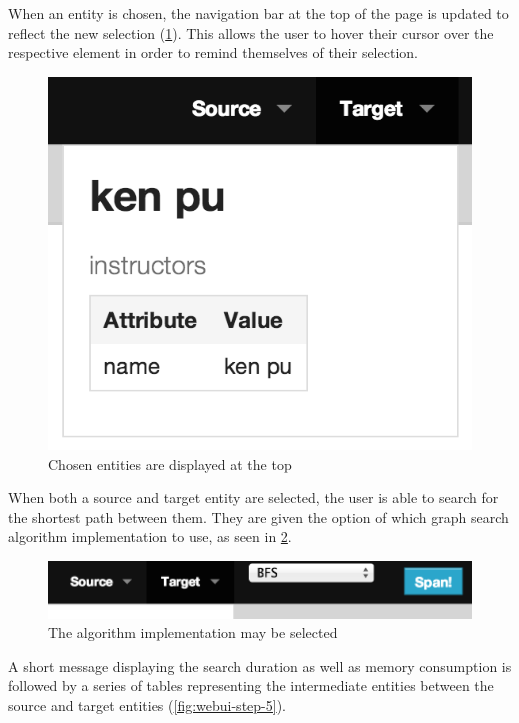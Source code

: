 	When an entity is chosen, the navigation bar at the top of the page is updated to reflect the new selection (\cref{fig:webui-step-3}).  This allows the user to hover their cursor over the respective element in order to remind themselves of their selection.
	
	\begin{figure}[H]
		\centering
		\includegraphics[scale=0.5]{figures/images/step-3}
		
		\caption{Chosen entities are displayed at the top}
		\label{fig:webui-step-3}
	\end{figure}
	
	When both a source and target entity are selected, the user is able to search for the shortest path between them.  They are given the option of which graph search algorithm implementation to use, as seen in \cref{fig:webui-step-4}.
	
	\begin{figure}[H]
		\centering
		\includegraphics[scale=0.5]{figures/images/step-4}
		
		\caption{The algorithm implementation may be selected}
		\label{fig:webui-step-4}
	\end{figure}
	
	A short message displaying the search duration as well as memory consumption is followed by a series of tables representing the intermediate entities between the source and target entities (\cref{fig:webui-step-5}).
	
